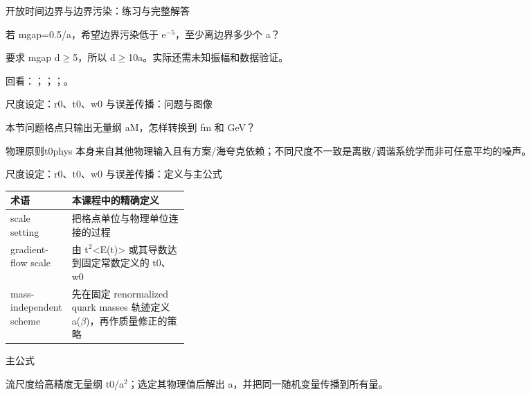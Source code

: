 \begin{frame}[t]{开放时间边界与边界污染：练习与完整解答}
\footnotesize
\begin{block}{}若 mgap=0.5/\allowbreak{}a，希望边界污染低于 e\ensuremath{^{-5}}，至少离边界多少个 a？\end{block}
\begin{exampleblock}{}要求 mgap d\ensuremath{\ge}5，所以 d\ensuremath{\ge}10a。实际还需未知振幅和数据验证。\end{exampleblock}
\vfill
\scriptsize 回看：；；；。
\end{frame}

\begin{frame}[t]{尺度设定：r0、t0、w0 与误差传播：问题与图像}
\footnotesize
\begin{block}{本节问题}格点只输出无量纲 aM，怎样转换到 fm 和 GeV？\end{block}
\begin{block}{物理原则}\quad t0phys 本身来自其他物理输入且有方案/\allowbreak{}海夸克依赖；不同尺度不一致是离散/\allowbreak{}调谐系统学而非可任意平均的噪声。\end{block}
\end{frame}

\begin{frame}[t]{尺度设定：r0、t0、w0 与误差传播：定义与主公式}
\footnotesize\begin{tabularx}{\linewidth}{p{0.30\linewidth}Y}
\toprule 术语 & 本课程中的精确定义\\\midrule
{} scale setting & 把格点单位与物理单位连接的过程\\
 gradient-flow scale & 由 t\ensuremath{^{2}}<E(t)> 或其导数达到固定常数定义的 t0、w0\\
 mass-independent scheme & 先在固定 renormalized quark masses 轨迹定义 a(\ensuremath{\beta})，再作质量修正的策略\\
\bottomrule\end{tabularx}\vspace{0.15cm}
\begin{block}{ 主公式}\centering{}\end{block}
流尺度给高精度无量纲 t0/\allowbreak{}a\ensuremath{^{2}}；选定其物理值后解出 a，并把同一随机变量传播到所有量。
\end{frame}

